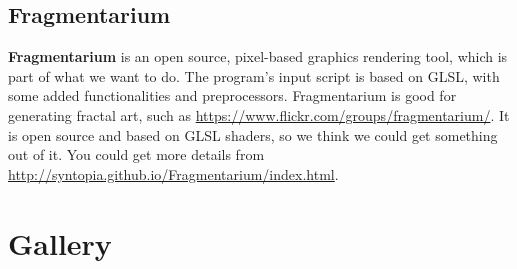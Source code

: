 \documentclass[a4paper]{article}
\begin{document}
\subsection{Fragmentarium}
\textbf{Fragmentarium} is an open source, pixel-based graphics rendering tool, which is part of what we want to do.
The program's input script is based on GLSL, with some added functionalities and preprocessors.
Fragmentarium is good for generating fractal art, such as \url{https://www.flickr.com/groups/fragmentarium/}.
It is open source and based on GLSL shaders, so we think we could get something out of it.
You could get more details from \url{http://syntopia.github.io/Fragmentarium/index.html}.

\section{Gallery}
\begin{figure}[H]
\centering
{}
\end{figure}

\begin{figure}[H]
\centering
{}
\end{figure}
\end{document}
